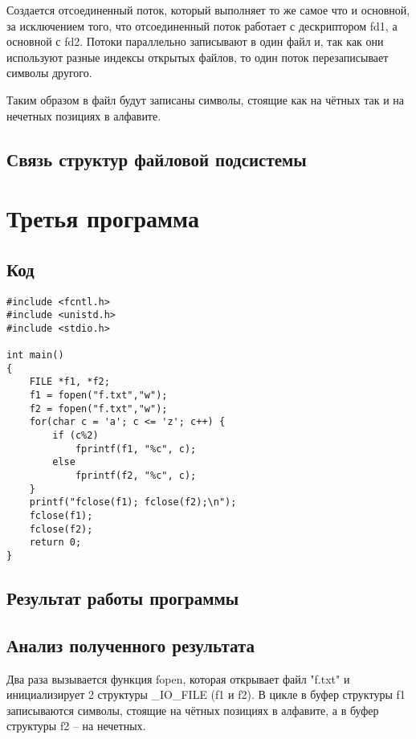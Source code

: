 Создается отсоединенный поток, который выполняет то же самое что и основной, за исключением того, что отсоединенный поток работает с дескриптором fd1, а основной с fd2. Потоки параллельно записывают в один файл и, так как они используют разные индексы открытых файлов, то один поток перезаписывает символы другого.

Таким образом в файл будут записаны символы, стоящие как на чётных так и на нечетных позициях в алфавите.

\section{Связь структур файловой подсистемы}
\FloatBarrier
{}
\FloatBarrier


\chapter{Третья программа}

\section{Код}
\begin{lstlisting}[caption={Программа 3}, label=lst:p3]
#include <fcntl.h>
#include <unistd.h>
#include <stdio.h>

int main() 
{
	FILE *f1, *f2;
	f1 = fopen("f.txt","w");
	f2 = fopen("f.txt","w");
	for(char c = 'a'; c <= 'z'; c++) {
		if (c%2)
			fprintf(f1, "%c", c);
		else
			fprintf(f2, "%c", c);
	}
	printf("fclose(f1); fclose(f2);\n");
	fclose(f1);
	fclose(f2);
	return 0;
}
\end{lstlisting}

\section{Результат работы программы}
\FloatBarrier
{}
\FloatBarrier

\section{Анализ полученного результата}
Два раза вызывается функция fopen, которая открывает файл "f.txt" и инициализирует 2 структуры \_IO\_FILE (f1 и f2). В цикле в буфер структуры f1 записываются символы, стоящие на чётных позициях в алфавите, а в буфер структуры f2 -- на нечетных. 

